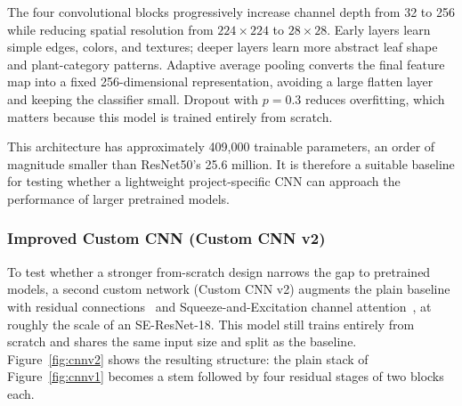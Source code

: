 \documentclass[12pt,a4paper]{article}
\begin{document}
The four convolutional blocks progressively increase channel depth from 32 to 256 while reducing spatial resolution from $224 \times 224$ to $28 \times 28$. Early layers learn simple edges, colors, and textures; deeper layers learn more abstract leaf shape and plant-category patterns. Adaptive average pooling converts the final feature map into a fixed 256-dimensional representation, avoiding a large flatten layer and keeping the classifier small. Dropout with $p=0.3$ reduces overfitting, which matters because this model is trained entirely from scratch.

This architecture has approximately 409{,}000 trainable parameters, an order of magnitude smaller than ResNet50's 25.6 million. It is therefore a suitable baseline for testing whether a lightweight project-specific CNN can approach the performance of larger pretrained models.

\subsubsection{Improved Custom CNN (Custom CNN v2)}
To test whether a stronger from-scratch design narrows the gap to pretrained models, a second custom network (Custom CNN v2) augments the plain baseline with residual connections~\cite{he2016} and Squeeze-and-Excitation channel attention~\cite{hu2018}, at roughly the scale of an SE-ResNet-18. This model still trains entirely from scratch and shares the same input size and split as the baseline. Figure~\ref{fig:cnnv2} shows the resulting structure: the plain stack of Figure~\ref{fig:cnnv1} becomes a stem followed by four residual stages of two blocks each.
\end{document}
